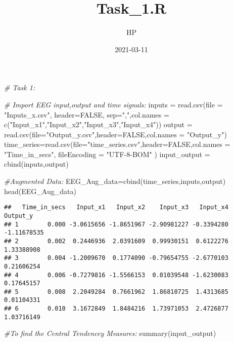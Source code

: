 \documentclass[
]{article}
\title{Task\_1.R}
\author{HP}
\date{2021-03-11}
\newenvironment{Shaded}{\begin{snugshade}}{\end{snugshade}}
\newcommand{\AttributeTok}[1]{\textcolor[rgb]{0.77,0.63,0.00}{#1}}
\newcommand{\CommentTok}[1]{\textcolor[rgb]{0.56,0.35,0.01}{\textit{#1}}}
\newcommand{\ConstantTok}[1]{\textcolor[rgb]{0.00,0.00,0.00}{#1}}
\newcommand{\FunctionTok}[1]{\textcolor[rgb]{0.00,0.00,0.00}{#1}}
\newcommand{\NormalTok}[1]{#1}
\newcommand{\OtherTok}[1]{\textcolor[rgb]{0.56,0.35,0.01}{#1}}
\newcommand{\StringTok}[1]{\textcolor[rgb]{0.31,0.60,0.02}{#1}}
\begin{document}
\maketitle

\begin{Shaded}
\begin{Highlighting}[]
\CommentTok{\# Task 1:}

\CommentTok{\# Import EEG input,output and time signals:}
\NormalTok{inputs }\OtherTok{=} \FunctionTok{read.csv}\NormalTok{(}\AttributeTok{file =} \StringTok{"Inputs\_x.csv"}\NormalTok{, }\AttributeTok{header=}\ConstantTok{FALSE}\NormalTok{, }\AttributeTok{sep=}\StringTok{","}\NormalTok{,}\AttributeTok{col.names =} \FunctionTok{c}\NormalTok{(}\StringTok{"Input\_x1"}\NormalTok{,}\StringTok{"Input\_x2"}\NormalTok{,}\StringTok{"Input\_x3"}\NormalTok{,}\StringTok{"Input\_x4"}\NormalTok{))}
\NormalTok{output }\OtherTok{=} \FunctionTok{read.csv}\NormalTok{(}\AttributeTok{file=}\StringTok{"Output\_y.csv"}\NormalTok{,}\AttributeTok{header=}\ConstantTok{FALSE}\NormalTok{,}\AttributeTok{col.names =} \StringTok{"Output\_y"}\NormalTok{)}
\NormalTok{time\_series}\OtherTok{=}\FunctionTok{read.csv}\NormalTok{(}\AttributeTok{file=}\StringTok{"time\_series.csv"}\NormalTok{,}\AttributeTok{header=}\ConstantTok{FALSE}\NormalTok{,}\AttributeTok{col.names =} \StringTok{"Time\_in\_secs"}\NormalTok{, }\AttributeTok{fileEncoding =} \StringTok{"UTF{-}8{-}BOM"}\NormalTok{ )}
\NormalTok{input\_output }\OtherTok{=} \FunctionTok{cbind}\NormalTok{(inputs,output)}

\CommentTok{\#Augmented Data:}
\NormalTok{EEG\_Aug\_data}\OtherTok{=}\FunctionTok{cbind}\NormalTok{(time\_series,inputs,output)}
\FunctionTok{head}\NormalTok{(EEG\_Aug\_data)}
\end{Highlighting}
\end{Shaded}

\begin{verbatim}
##   Time_in_secs   Input_x1   Input_x2    Input_x3   Input_x4    Output_y
## 1        0.000 -3.0615656 -1.8651967 -2.90981227 -0.3394280 -1.11678535
## 2        0.002  0.2446936  2.0391609  0.99930151  0.6122276  1.33388908
## 3        0.004 -1.2009670  0.1774090 -0.79654755 -2.6770103  0.21606254
## 4        0.006 -0.7279816 -1.5566153  0.01039548 -1.6230083  0.17645157
## 5        0.008  2.2049284  0.7661962  1.86810725  1.4313685  0.01104331
## 6        0.010  3.1672849  1.8484216  1.73971053  2.4726877  1.03716149
\end{verbatim}

\begin{Shaded}
\begin{Highlighting}[]
\CommentTok{\#To find the Central Tendencey Measures:}
\FunctionTok{summary}\NormalTok{(input\_output)}
\end{Highlighting}
\end{Shaded}
\end{document}
